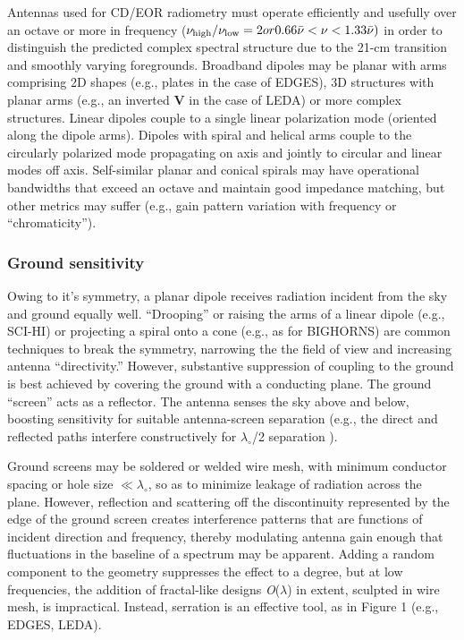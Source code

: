 Antennas used for CD/EOR radiometry must operate efficiently and usefully over an octave or more in frequency ($\nu_{\rm high}/\nu_{\rm low}=2 or 0.66\Bar{\nu}<\nu<1.33\Bar{\nu})$ in order to distinguish the predicted complex spectral structure due to the 21-cm transition and smoothly varying foregrounds.  Broadband dipoles may be planar with arms comprising 2D shapes (e.g., plates in the case of EDGES), 3D structures with planar arms (e.g., an inverted {\bf V} in the case of LEDA) or more complex structures.  Linear dipoles couple to a single linear polarization mode (oriented along the dipole arms).  Dipoles with spiral and helical arms couple to the circularly polarized mode propagating on axis and jointly to circular and linear modes off axis.
Self-similar planar and conical spirals may have operational bandwidths that exceed an octave and maintain good impedance matching, but other metrics may suffer (e.g., gain pattern variation with frequency or ``chromaticity''). 

\subsubsection{Ground sensitivity}

Owing to it's symmetry, a planar dipole receives radiation incident from the sky and ground equally well.  ``Drooping'' or raising the arms of a linear dipole (e.g., SCI-HI) or projecting a spiral onto a cone (e.g., as for BIGHORNS) are common techniques to break the symmetry, narrowing the the field of view and increasing antenna ``directivity.''  However, substantive suppression of coupling to the ground is best achieved by covering the ground with a conducting plane.  The ground ``screen'' acts as a reflector.  The antenna senses the sky above and below, boosting sensitivity for suitable antenna-screen separation (e.g., the direct and reflected paths interfere constructively for $\lambda_\circ$/2 separation ). 

Ground screens may be soldered or welded wire mesh, with minimum conductor spacing or hole size $\ll \lambda_\circ$, so as to minimize leakage of radiation across the plane.  However, reflection and scattering off the discontinuity represented by the edge of the ground screen creates interference patterns that are functions of incident direction and frequency, thereby modulating antenna gain enough that fluctuations in the baseline of a spectrum may be apparent.  Adding a random component to the geometry suppresses the effect to a degree, but at low frequencies, the addition of fractal-like designs {\it O}($\lambda$) in extent, sculpted in wire mesh, is impractical.  Instead, serration is an effective tool, as in Figure 1 (e.g., EDGES, LEDA).

